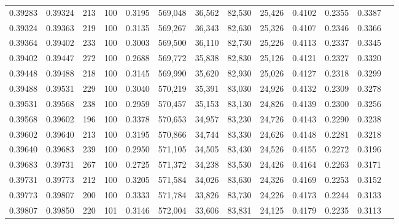 \begin{tabular}{rrrrrrrrrrrrr}
0.39283 & 0.39324 &   213 & 100 &                                     0.3195 & 569,048 &  36,562 &  82,530 &  25,426 & 0.4102 & 0.2355 & 0.3387 \\
0.39324 & 0.39363 &   219 & 100 &                                     0.3135 & 569,267 &  36,343 &  82,630 &  25,326 & 0.4107 & 0.2346 & 0.3366 \\
0.39364 & 0.39402 &   233 & 100 &                                     0.3003 & 569,500 &  36,110 &  82,730 &  25,226 & 0.4113 & 0.2337 & 0.3345 \\
0.39402 & 0.39447 &   272 & 100 &                                     0.2688 & 569,772 &  35,838 &  82,830 &  25,126 & 0.4121 & 0.2327 & 0.3320 \\
0.39448 & 0.39488 &   218 & 100 &                                     0.3145 & 569,990 &  35,620 &  82,930 &  25,026 & 0.4127 & 0.2318 & 0.3299 \\
0.39488 & 0.39531 &   229 & 100 &                                     0.3040 & 570,219 &  35,391 &  83,030 &  24,926 & 0.4132 & 0.2309 & 0.3278 \\
0.39531 & 0.39568 &   238 & 100 &                                     0.2959 & 570,457 &  35,153 &  83,130 &  24,826 & 0.4139 & 0.2300 & 0.3256 \\
0.39568 & 0.39602 &   196 & 100 &                                     0.3378 & 570,653 &  34,957 &  83,230 &  24,726 & 0.4143 & 0.2290 & 0.3238 \\
0.39602 & 0.39640 &   213 & 100 &                                     0.3195 & 570,866 &  34,744 &  83,330 &  24,626 & 0.4148 & 0.2281 & 0.3218 \\
0.39640 & 0.39683 &   239 & 100 &                                     0.2950 & 571,105 &  34,505 &  83,430 &  24,526 & 0.4155 & 0.2272 & 0.3196 \\
0.39683 & 0.39731 &   267 & 100 &                                     0.2725 & 571,372 &  34,238 &  83,530 &  24,426 & 0.4164 & 0.2263 & 0.3171 \\
0.39731 & 0.39773 &   212 & 100 &                                     0.3205 & 571,584 &  34,026 &  83,630 &  24,326 & 0.4169 & 0.2253 & 0.3152 \\
0.39773 & 0.39807 &   200 & 100 &                                     0.3333 & 571,784 &  33,826 &  83,730 &  24,226 & 0.4173 & 0.2244 & 0.3133 \\
0.39807 & 0.39850 &   220 & 101 &                                     0.3146 & 572,004 &  33,606 &  83,831 &  24,125 & 0.4179 & 0.2235 & 0.3113 \\

\end{tabular}
